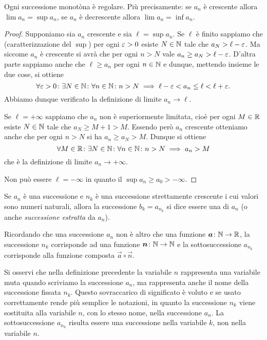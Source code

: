 \begin{theorem}
\mymark{***}
Ogni successione monotòna è regolare.
Più precisamente: se $a_n$ è crescente allora $\lim a_n = \sup a_n$,
se $a_n$ è decrescente allora $\lim a_n = \inf a_n$.
\end{theorem}
%
\begin{proof}
\mymark{***}
Supponiamo sia $a_n$ crescente e sia $\ell = \sup a_n$.
Se $\ell$ è finito sappiamo che (caratterizzazione del $\sup$)
per ogni $\varepsilon>0$ esiste $N\in \mathbb N$ tale che $a_N> \ell -\varepsilon$.
Ma siccome $a_n$ è crescente si avrà che per ogni $n>N$ vale
$a_n \ge a_N > \ell-\varepsilon$.
D'altra parte sappiamo anche che $\ell\ge a_n$ per ogni $n\in \mathbb N$
e dunque, mettendo insieme le due cose, si ottiene
\[
  \forall \varepsilon>0 \colon \exists N\in \mathbb N \colon \forall n\in \mathbb N\colon
   n>N \implies \ell-\varepsilon < a_n \le \ell < \ell + \varepsilon.
\]
Abbiamo dunque verificato la definizione di limite $a_n \to \ell$.

Se  $\ell=+\infty$ sappiamo che $a_n$ non è superiormente limitata, cioè per ogni $M\in \mathbb R$ esiste $N\in \mathbb N$ tale che $a_N \ge M+1 > M$.
Essendo però $a_n$ crescente otteniamo anche che per ogni $n>N$ si
 ha $a_n \ge a_N > M$. Dunque si ottiene
 \[
 \forall M\in \mathbb R\colon\exists N\in \mathbb N\colon \forall n \in \mathbb N\colon
  n>N \implies a_n > M
 \]
 che è la definizione di limite $a_n \to +\infty$.

Non può essere $\ell = -\infty$ in quanto il $\sup a_n \ge a_0 > -\infty$.
\end{proof}

\begin{definition}[sottosuccessione]
\mymark{*}
Se $a_n$ è una successione e $n_k$ è una successione strettamente crescente i cui valori sono numeri naturali, allora la successione
$b_k = a_{n_k}$ si dice essere una  di $a_n$
(o anche \emph{successione estratta} da $a_n$).
\end{definition}

Ricordando che una successione $a_n$ non è altro che una funzione
$\boldsymbol a\colon \mathbb N \to \mathbb R$, la successione $n_k$ corrisponde ad una funzione
$\boldsymbol n\colon \mathbb N \to \mathbb N$ e la sottosuccessione $a_{n_k}$ corrisponde alla
funzione composta $\vec a \circ \vec n$.

Si osservi che nella definizione precedente la variabile $n$ rappresenta
una variabile muta quando scriviamo la successione $a_n$, ma
rappresenta anche il nome della successione fissata $n_k$.
Questo sovraccarico
di significato è voluto e se usato correttamente rende più semplice
le notazioni, in quanto la successione $n_k$ viene sostituita alla
variabile $n$, con lo stesso nome, nella successione $a_n$.
La sottosuccessione $a_{n_k}$ risulta essere una successione nella variabile $k$, non nella variabile $n$.

